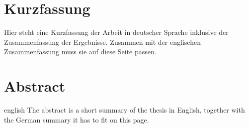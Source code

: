 \thispagestyle{plain}

\section*{Kurzfassung}
Hier steht eine Kurzfassung der Arbeit in deutscher Sprache inklusive der Zusammenfassung der
Ergebnisse.
Zusammen mit der englischen Zusammenfassung muss sie auf diese Seite passen.

\section*{Abstract}
\begin{foreignlanguage}{english}
The abstract is a short summary of the thesis in English, together with the German summary it has to fit on this page.
\end{foreignlanguage}
